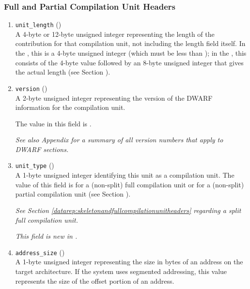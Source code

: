 \subsubsection{Full and Partial Compilation Unit Headers}
\eb
\label{datarep:compilationunitheader}
\begin{enumerate}[1. ]

\item \texttt{unit\_length} () \\
A 4-byte or 12-byte 
unsigned integer representing the length
of the \dotdebuginfo{} contribution for that compilation unit,
not including the length field itself. In the \thirtytwobitdwarfformat,
this is a 4-byte unsigned integer (which must be less
than \xfffffffzero); in the \sixtyfourbitdwarfformat, this consists
of the 4-byte value \wffffffff followed by an 8-byte unsigned
integer that gives the actual length 
(see Section ).

\item  \texttt{version} (\HFTuhalf) \\
A 2-byte unsigned integer representing the version of the
DWARF information for the compilation unit.
 
The value in this field is \versiondotdebuginfo.

\textit{See also Appendix 
for a summary of all version numbers that apply to DWARF sections.}

\item \texttt{unit\_type} (\HFTubyte) \\
A 1-byte unsigned integer identifying this unit as a compilation unit.
The value of this field is 
\DWUTcompile{} for a 
\bb
(non-split) full compilation unit or
\DWUTpartial{} for a (non-split) partial compilation unit
\eb
(see Section ).

\textit{See 
\bb
Section \ref{datarep:skeletonandfullcompilationunitheaders} 
regarding a split full compilation unit.
\eb}

\textit{This field is new in \DWARFVersionV.}

\item \texttt{address\_size} (\HFTubyte) \\
A 1-byte unsigned integer representing the size in bytes of
an address on the target architecture. If the system uses
segmented addressing, this value represents the size of the
offset portion of an address.


\end{enumerate}
